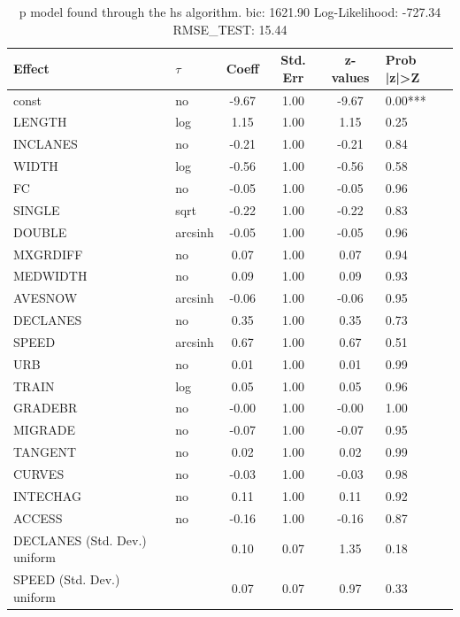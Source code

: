 \begin{table}
	\caption{p model found through the hs algorithm. bic: 1621.90 Log-Likelihood: -727.34 RMSE_TEST: 15.44}
	\begin{center}
		\begin{tabular}{|l|l|c|c|c|l|}
			\hline
			Effect & $\tau$ & Coeff & Std. Err & z-values & Prob |z|>Z \\
			\hline
			const & no & -9.67 & 1.00 & -9.67 & 0.00*** \\
			\hline
			LENGTH & log & 1.15 & 1.00 & 1.15 & 0.25 \\
			\hline
			INCLANES & no & -0.21 & 1.00 & -0.21 & 0.84 \\
			\hline
			WIDTH & log & -0.56 & 1.00 & -0.56 & 0.58 \\
			\hline
			FC & no & -0.05 & 1.00 & -0.05 & 0.96 \\
			\hline
			SINGLE & sqrt & -0.22 & 1.00 & -0.22 & 0.83 \\
			\hline
			DOUBLE & arcsinh & -0.05 & 1.00 & -0.05 & 0.96 \\
			\hline
			MXGRDIFF & no & 0.07 & 1.00 & 0.07 & 0.94 \\
			\hline
			MEDWIDTH & no & 0.09 & 1.00 & 0.09 & 0.93 \\
			\hline
			AVESNOW & arcsinh & -0.06 & 1.00 & -0.06 & 0.95 \\
			\hline
			DECLANES & no & 0.35 & 1.00 & 0.35 & 0.73 \\
			\hline
			SPEED & arcsinh & 0.67 & 1.00 & 0.67 & 0.51 \\
			\hline
			URB & no & 0.01 & 1.00 & 0.01 & 0.99 \\
			\hline
			TRAIN & log & 0.05 & 1.00 & 0.05 & 0.96 \\
			\hline
			GRADEBR & no & -0.00 & 1.00 & -0.00 & 1.00 \\
			\hline
			MIGRADE & no & -0.07 & 1.00 & -0.07 & 0.95 \\
			\hline
			TANGENT & no & 0.02 & 1.00 & 0.02 & 0.99 \\
			\hline
			CURVES & no & -0.03 & 1.00 & -0.03 & 0.98 \\
			\hline
			INTECHAG & no & 0.11 & 1.00 & 0.11 & 0.92 \\
			\hline
			ACCESS & no & -0.16 & 1.00 & -0.16 & 0.87 \\
			\hline
			DECLANES (Std. Dev.) uniform &  & 0.10 & 0.07 & 1.35 & 0.18 \\
			\hline
			SPEED (Std. Dev.) uniform &  & 0.07 & 0.07 & 0.97 & 0.33 \\

\end{tabular}
\end{center}
\end{table}
